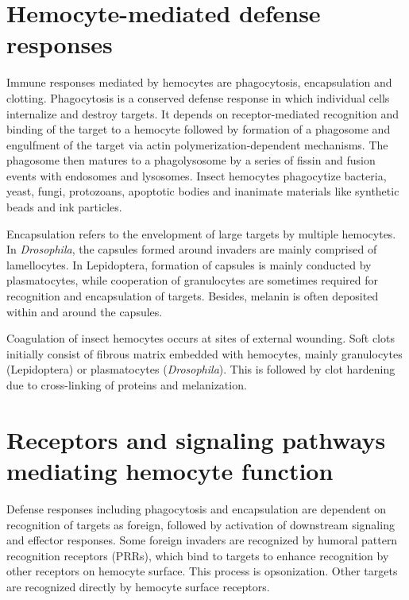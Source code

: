 \documentclass[11pt]{article}
\begin{document}
\section{Hemocyte-mediated defense responses}
Immune responses mediated by hemocytes are phagocytosis, encapsulation and clotting. 
Phagocytosis is a conserved defense response in which individual cells internalize and destroy targets. 
It depends on receptor-mediated recognition and binding of the target to a hemocyte followed by formation of a phagosome and engulfment of the target via actin polymerization-dependent mechanisms. 
The phagosome then matures to a phagolysosome by a series of fissin and fusion events with endosomes and lysosomes. 
Insect hemocytes phagocytize bacteria, yeast, fungi, protozoans, apoptotic bodies and inanimate materials like synthetic beads and ink particles. 

\newline

Encapsulation refers to the envelopment of large targets by multiple hemocytes. 
In \textit{Drosophila}, the capsules formed around invaders are mainly comprised of lamellocytes. 
In Lepidoptera, formation of capsules is mainly conducted by plasmatocytes, while cooperation of granulocytes are sometimes required for recognition and encapsulation of targets. 
Besides, melanin is often deposited within and around the capsules.

\newline

Coagulation of insect hemocytes occurs at sites of external wounding. 
Soft clots initially consist of fibrous matrix embedded with hemocytes, mainly granulocytes (Lepidoptera) or plasmatocytes (\textit{Drosophila}). 
This is followed by clot hardening due to cross-linking of proteins and melanization.

\section{Receptors and signaling pathways mediating hemocyte function}
Defense responses including phagocytosis and encapsulation are dependent on recognition of targets as foreign, followed by activation of downstream signaling and effector responses. 
Some foreign invaders are recognized by humoral pattern recognition receptors (PRRs), which bind to targets to enhance recognition by other receptors on hemocyte surface. 
This process is opsonization. 
Other targets are recognized directly by hemocyte surface receptors.
\end{document}
